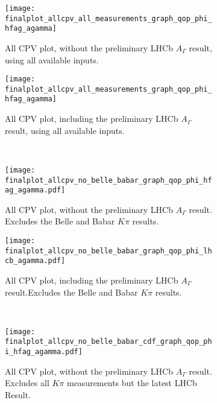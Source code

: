 \begin{figure}[tb]
  \begin{center}
    \begin{subfigure}[b]{0.3\textwidth}
      \centering
      \texttt{[image: finalplot\_allcpv\_all\_measurements\_graph\_qop\_phi\_hfag\_agamma]}
      \caption{All CPV plot, without the preliminary LHCb $A_\Gamma$ result, using all available inputs.}
      \label{fig:qop_all_cpv_no_agamma_all}
    \end{subfigure}%
    \hspace{2mm}
    \begin{subfigure}[b]{0.3\textwidth}
      \centering
      \texttt{[image: finalplot\_allcpv\_all\_measurements\_graph\_qop\_phi\_hfag\_agamma]}
      \caption{All CPV plot, including the preliminary LHCb $A_\Gamma$ result, using all available inputs.}
      \label{fig:qop_all_cpv_with_agamma_all}
    \end{subfigure}%
    \\
    \begin{subfigure}[b]{0.3\textwidth}
      \centering
      \texttt{[image: finalplot\_allcpv\_no\_belle\_babar\_graph\_qop\_phi\_hfag\_agamma.pdf]}
      \caption{All CPV plot, without the preliminary LHCb $A_\Gamma$ result. Excludes the Belle and Babar $K\pi$ results.}
      \label{fig:qop_all_cpv_no_agamma_nobb}
    \end{subfigure}%
    \hspace{2mm}
    \begin{subfigure}[b]{0.3\textwidth}
      \centering
      \texttt{[image: finalplot\_allcpv\_no\_belle\_babar\_graph\_qop\_phi\_lhcb\_agamma.pdf]}
      \caption{All CPV plot, including the preliminary LHCb $A_\Gamma$ result.Excludes the Belle and Babar $K\pi$ results.}
      \label{fig:qop_all_cpv_with_agamma_nobb}
    \end{subfigure}%
        \\
    \begin{subfigure}[b]{0.3\textwidth}
      \centering
      \texttt{[image: finalplot\_allcpv\_no\_belle\_babar\_cdf\_graph\_qop\_phi\_hfag\_agamma.pdf]}
      \caption{All CPV plot, without the preliminary LHCb $A_\Gamma$ result. Excludes all $K\pi$ measurements but the latest LHCb Result.}
      \label{fig:qop_all_cpv_no_agamma}
    \end{subfigure}%
    \hspace{2mm}
    \begin{subfigure}[b]{0.3\textwidth}

\end{subfigure}
\end{center}
\end{figure}
